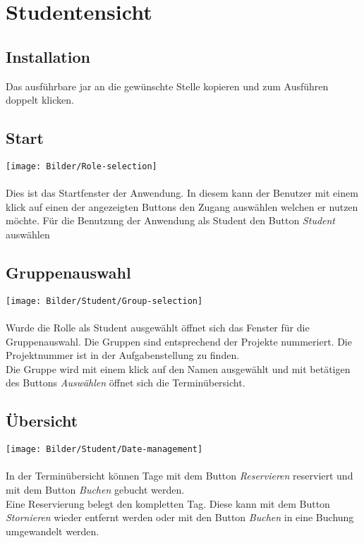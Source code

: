 \section{Studentensicht}

\subsection{Installation}
Das ausführbare jar an die gewünschte Stelle kopieren und zum Ausführen doppelt klicken.

\subsection{Start}
\texttt{[image: Bilder/Role-selection]}
\\
\\
Dies ist das Startfenster der Anwendung. In diesem kann der Benutzer mit einem klick auf einen der angezeigten Buttons den Zugang auswählen welchen er nutzen möchte. Für die Benutzung der Anwendung als Student den Button \textit{Student} auswählen


\subsection{Gruppenauswahl}
\texttt{[image: Bilder/Student/Group-selection]}
\\
\\
Wurde die Rolle als Student ausgewählt öffnet sich das Fenster für die Gruppenauswahl. Die Gruppen sind entsprechend der Projekte nummeriert. Die Projektnummer ist in der Aufgabenstellung zu finden. 
\\
Die Gruppe wird mit einem klick auf den Namen ausgewählt und mit betätigen des Buttons \textit{Auswählen} öffnet sich die Terminübersicht.

\subsection{Übersicht}
\texttt{[image: Bilder/Student/Date-management]}
\\
\\
In der Terminübersicht können Tage mit dem Button \textit{Reservieren} reserviert und mit dem Button \textit{Buchen} gebucht werden. 
\\
Eine Reservierung belegt den kompletten Tag. Diese kann mit dem Button \textit{Stornieren} wieder entfernt werden oder mit den Button \textit{Buchen} in eine Buchung umgewandelt werden.

